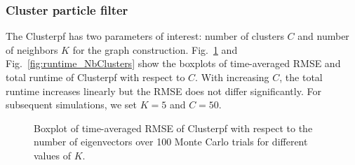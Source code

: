 \documentclass[10pt,letterpaper,final]{article}
\begin{document}
\subsubsection{Cluster particle filter}
The Clusterpf has two parameters of interest: number of clusters $C$ and number of neighbors $K$ for the graph construction. Fig.~\ref{fig:RMSE_NbClusters} and Fig.~\ref{fig:runtime_NbClusters} show the boxplots of time-averaged RMSE and total runtime of Clusterpf with respect to $C$. With increasing $C$, the total runtime increases linearly but the RMSE does not differ significantly. For subsequent simulations, we set $K=5$ and $C=50$. 

\begin{figure}
\centering
{}
\caption{Boxplot of time-averaged RMSE of Clusterpf with respect to the number of eigenvectors over 100 Monte Carlo trials for different values of $K$.}
\label{fig:RMSE_NbClusters}
\end{figure}
\end{document}
